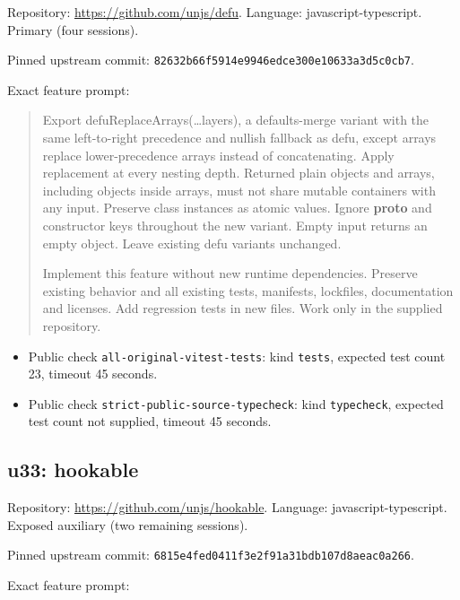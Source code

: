 \documentclass[manuscript,screen,nonacm]{acmart}
\providecommand{\tightlist}{\setlength{\itemsep}{0pt}\setlength{\parskip}{0pt}}
\begin{document}
Repository: \url{https://github.com/unjs/defu}. Language:
javascript-typescript. Primary (four sessions).

Pinned upstream commit:
\nolinkurl{82632b66f5914e9946edce300e10633a3d5c0cb7}.

Exact feature prompt:

\begin{quote}
Export defuReplaceArrays(\ldots layers), a defaults-merge variant with
the same left-to-right precedence and nullish fallback as defu, except
arrays replace lower-precedence arrays instead of concatenating. Apply
replacement at every nesting depth. Returned plain objects and arrays,
including objects inside arrays, must not share mutable containers with
any input. Preserve class instances as atomic values. Ignore
\textbf{proto} and constructor keys throughout the new variant. Empty
input returns an empty object. Leave existing defu variants unchanged.

Implement this feature without new runtime dependencies. Preserve
existing behavior and all existing tests, manifests, lockfiles,
documentation and licenses. Add regression tests in new files. Work only
in the supplied repository.
\end{quote}

\begin{itemize}
\tightlist
\item
  Public check \nolinkurl{all-original-vitest-tests}: kind
  \texttt{tests}, expected test count 23, timeout 45 seconds.
\item
  Public check \nolinkurl{strict-public-source-typecheck}: kind
  \texttt{typecheck}, expected test count not supplied, timeout 45
  seconds.
\end{itemize}

\subsection{u33: hookable}\label{u33-hookable}

Repository: \url{https://github.com/unjs/hookable}. Language:
javascript-typescript. Exposed auxiliary (two remaining sessions).

Pinned upstream commit:
\nolinkurl{6815e4fed0411f3e2f91a31bdb107d8aeac0a266}.

Exact feature prompt:
\end{document}
